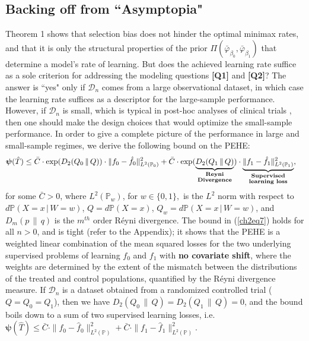 \documentclass [PhD] {uclathes}
\begin{document}
\subsection{Backing off from ``Asymptopia"} 
\label{backasymp}
Theorem 1 shows that selection bias does not hinder the optimal minimax rates, and that it is only the structural properties of the prior $\Pi(\bar{\varphi}_{\beta_0},\bar{\varphi}_{\beta_1})$ that determine a model's rate of learning. But does the achieved learning rate suffice as a sole criterion for addressing the modeling questions \textbf{[Q1]} and \textbf{[Q2]}? The answer is ``yes" only if $\mathcal{D}_n$ comes from a large observational dataset, in which case the learning rate suffices as a descriptor for the large-sample performance. However, if $\mathcal{D}_n$ is small, which is typical in post-hoc analyses of clinical trials \cite{foster2011subgroup}, then one should make the design choices that would optimize the small-sample performance. In order to give a complete picture of the performance in large and small-sample regimes, we derive the following bound on the PEHE:
\begin{align}
\mathbold{\psi}(\hat{T}) &\leq \bar{C}\cdot \exp(D_2(Q_0\,\|\,Q))\cdot\|f_0-\hat{f}_0\|^2_{L^2(\mathbb{P}_0)} + \bar{C}\cdot \exp(\underbrace{D_2(Q_1\,\|\,Q)}_{\substack{\textbf{Reyni}\\ \textbf{Divergence}}})\cdot\underbrace{\|f_1-\hat{f}_1\|^2_{L^2(\mathbb{P}_1)}}_{\substack{\textbf{Supervised}\\ \textbf{learning\,\,loss}}},
\label{ch2eq7} 
\end{align}	
for some $\bar{C} > 0$, where $L^2(\mathbb{P}_w)$, for $w \in \{0,1\},$ is the $L^2$ norm with respect to $d\mathbb{P}(X=x\,|\,W=w)$, $Q = d\mathbb{P}(X=x)$, $Q_w = d\mathbb{P}(X=x\,|\,W=w)$, and $D_{m}(p\,\|\,q)$ is the $m^{th}$ order R\'eyni divergence. The bound in (\ref{ch2eq7}) holds for all $n > 0$, and is tight (refer to the Appendix); it shows that the PEHE is a weighted linear combination of the mean squared losses for the two underlying supervised problems of learning $f_0$ and $f_1$ with \textbf{no covariate shift}, where the weights are determined by the extent of the mismatch between the distributions of the treated and control populations, quantified by the R\'eyni divergence measure. If $\mathcal{D}_n$ is a dataset obtained from a randomized controlled trial ($Q=Q_0=Q_1$), then we have $D_2(Q_0\,\|\,Q)=D_2(Q_1\,\|\,Q) = 0$, and the bound boils down to a sum of two supervised learning losses, i.e. $\mathbold{\psi}(\hat{T}) \leq \bar{C}\cdot\|f_0-\hat{f}_0\|^2_{L^2(\mathbb{P})} + \bar{C}\cdot\|f_1-\hat{f}_1\|^2_{L^2(\mathbb{P})}$.
\end{document}
